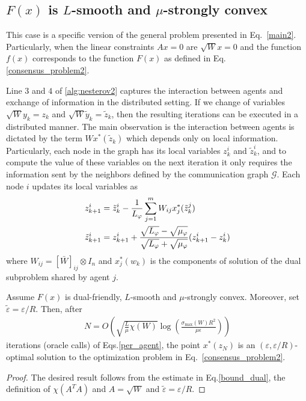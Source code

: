 \documentclass[final]{siamart1116}
\numberwithin{theorem}{section}
\begin{document}
	\subsection{$F(x)$ is \mbox{$L$-smooth} and $\mu$-strongly convex}\label{sec:strong_smooth}
	
	This case is a specific version of the general problem presented in Eq.~\eqref{main2}. Particularly, when the linear constraints $Ax=0$ are $\sqrt{W}x=0$ and the function $f(x)$ corresponds to the function $F(x)$ as defined in Eq.\eqref{consensus_problem2}.
	
	Line $3$ and $4$ of \cref{alg:nesterov2} captures the interaction between agents and exchange of information in the distributed setting.  If we change of variables $\sqrt{W}y_k = z_k$ and \mbox{$\sqrt{W}\tilde y_k = \tilde z_k$}, then the resulting iterations can be executed in a distributed manner. The main observation is the interaction between agents is dictated by the term $Wx^*(\tilde z_k)$ which depends only on local information. Particularly, each node in the graph has its local variables $z_k^i$ and $\tilde z_k^i$, and to compute the value of these variables on the next iteration it only requires the information sent by the neighbors defined by the communication graph $\mathcal{G}$. Each node $i$ updates its local variables as
	\begin{subequations}\label{per_agent}
	\begin{align}
	z_{k+1}^i &= \tilde z_k^i - \frac{1}{L_\varphi} \sum_{j=1}^{m} W_{ij} x^{*}_j(\tilde z_k^j) \\
	\tilde z_{k+1}^i &= z_{k+1}^i + \frac{\sqrt{L_\varphi} - \sqrt{\mu_\varphi\vphantom{L_\varphi}}}{\sqrt{L_\varphi}+ \sqrt{\mu_\varphi\vphantom{L_\varphi}}}(z_{k+1}^i - z_k^i)
	\end{align}  
	\end{subequations}
	where $W_{ij} = [\bar W]_{ij} \otimes I_n$ and $x^{*}_j(w_k)$ is the components of solution of the dual subproblem shared by agent $j$. 
	
	
	\begin{theorem}[Case $1$]\label{thm:case1} 
		Assume $F(x)$ is dual-friendly, \mbox{$L$-smooth} and $\mu$-strongly convex. Moreover, set $\tilde{\varepsilon} = \varepsilon/ R$. Then, after
		\begin{align*}
		N = O\left( \sqrt{\frac{L}{\mu}\chi(W)} \log \left( \frac{\sigma_{\max}(W)R^2}{\mu \epsilon} \right) \right) 
		\end{align*}
		iterations (oracle calls) of Eqs.\cref{per_agent}, the point $x^*(z_N)$ is an $(\varepsilon,\varepsilon/R )$-optimal solution to the optimization problem in Eq.~\eqref{consensus_problem2}.
	\end{theorem}
	\begin{proof}
		The desired result follows from the estimate in Eq.\cref{bound_dual}, the definition of $\chi(A^TA)$ and $A = \sqrt{W}$ and $\tilde \varepsilon =\varepsilon/R$.
	\end{proof}
	
\end{document}

